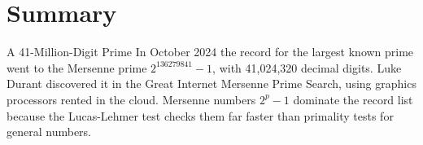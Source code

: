 \section{Summary}\label{sec:primes-summary}
\begin{didyouknow}{A 41-Million-Digit Prime}
In October 2024 the record for the largest known prime went to the Mersenne prime $2^{136279841}-1$, with 41{,}024{,}320 decimal digits. Luke Durant discovered it in the Great Internet Mersenne Prime Search, using graphics processors rented in the cloud. Mersenne numbers $2^p-1$ dominate the record list because the Lucas-Lehmer test checks them far faster than primality tests for general numbers.
\end{didyouknow}

